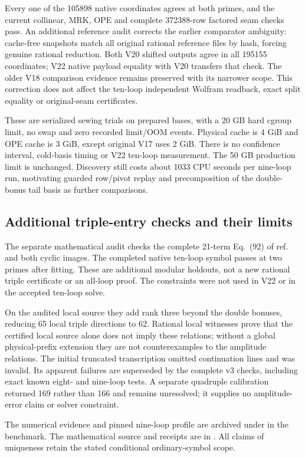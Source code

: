 \documentclass[11pt]{article}
\begin{document}
Every one of the 105898 native coordinates agrees at both primes, and the
current collinear, MRK, OPE and complete 372388-row factored seam checks pass.
An additional reference audit corrects the earlier comparator ambiguity:
cache-free snapshots match all original rational reference files by hash,
forcing genuine rational reduction. Both V20 shifted outputs agree in all
195155 coordinates; V22 native payload equality with V20 transfers that
check. The older V18 comparison evidence remains preserved with its narrower
scope. This correction does not affect the ten-loop independent Wolfram
readback, exact split equality or original-seam certificates.

These are serialized sewing trials on prepared bases, with a 20 GB hard
cgroup limit, no swap and zero recorded limit/OOM events. Physical cache is
4 GiB and OPE cache is 3 GiB, except original V17 uses 2 GiB. There is no
confidence interval, cold-basis timing or V22 ten-loop measurement. The
50 GB production limit is unchanged. Discovery still costs about 1033 CPU
seconds per nine-loop run, motivating guarded row/pivot replay and
precomposition of the double-bonus tail basis as further comparisons.

\subsection{Additional triple-entry checks and their limits}
The separate mathematical audit checks the complete 21-term Eq.~(92) of
ref.~\cite{dixonliu} and both cyclic images. The completed native ten-loop
symbol passes at two primes after fitting. These are additional modular
holdouts, not a new rational triple certificate or an all-loop proof.
The constraints were not used in V22 or in the accepted ten-loop solve.

On the audited local source they add rank three beyond the double bonuses,
reducing 65 local triple directions to 62. Rational local witnesses prove
that the certified local source alone does not imply these relations;
without a global physical-prefix extension they are not counterexamples to
the amplitude relations. The initial truncated transcription omitted
continuation lines and was invalid. Its apparent failures are superseded
by the complete v3 checks, including exact known eight- and nine-loop tests.
A separate quadruple calibration returned 169 rather than 166 and remains
unresolved; it supplies no amplitude-error claim or solver constraint.

The numerical evidence and pinned nine-loop profile are archived under
 in the benchmark. The mathematical source and
receipts are in . All claims of
uniqueness retain the stated conditional ordinary-symbol scope.
\end{document}

